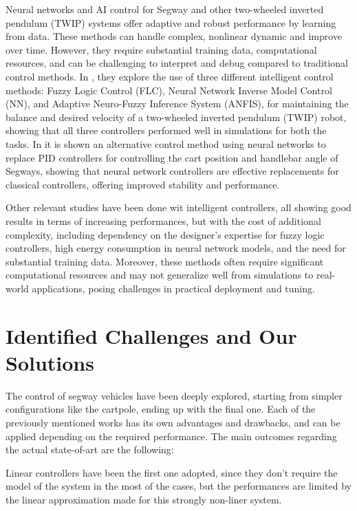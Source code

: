 Neural networks and AI control for Segway and other two-wheeled inverted pendulum (TWIP) systems offer adaptive and robust performance by learning from data. These methods can handle complex, nonlinear dynamic and improve over time. However, they require substantial training data, computational resources, and can be challenging to interpret and debug compared to traditional control methods.
In \cite{Bature2016INTELLIGENTCF}, they explore the use of three different intelligent control methods: Fuzzy Logic Control (FLC), Neural Network Inverse Model Control (NN), and Adaptive Neuro-Fuzzy Inference System (ANFIS), for maintaining the balance and desired velocity of a two-wheeled inverted pendulum (TWIP) robot, showing that all three controllers performed well in simulations for both the tasks.
In \cite{Ahmed-et-al} it is shown an alternative control method using neural networks to replace PID controllers for controlling the cart position and handlebar angle of Segways, showing that neural network controllers are effective replacements for classical controllers, offering improved stability and performance.

Other relevant studies have been done wit intelligent controllers, all showing good results in terms of increasing performances, but with the cost of additional complexity, including dependency on the designer's expertise for fuzzy logic controllers, high energy consumption in neural network models, and the need for substantial training data.
Moreover, these methods often require significant computational resources and may not generalize well from simulations to real-world applications, posing challenges in practical deployment and tuning.

\section{Identified Challenges and Our Solutions}
\label{sec:Identified Challenges and Our Solutions}

The control of segway vehicles have been deeply explored, starting from simpler configurations like the cartpole, ending up with the final one.
Each of the previously mentioned works has its own advantages and drawbacks, and can be applied depending on the required performance.
The main outcomes regarding the actual state-of-art are the following:

Linear controllers have been the first one adopted, since they don't require the model of the system in the most of the cases, but the performances are limited by the linear approximation made for this strongly non-liner system.

